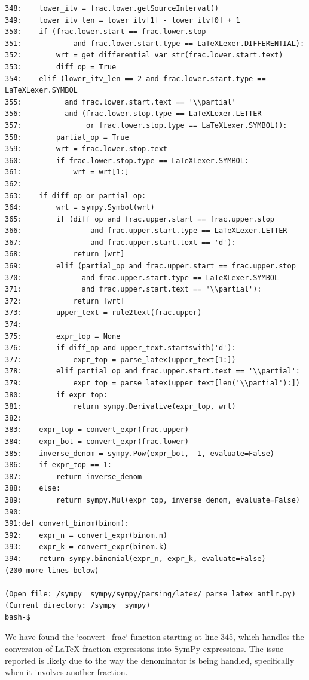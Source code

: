 {\begin{observationbox}
\begin{Verbatim}[breaklines=true, breakanywhere=true]
348:    lower_itv = frac.lower.getSourceInterval()
349:    lower_itv_len = lower_itv[1] - lower_itv[0] + 1
350:    if (frac.lower.start == frac.lower.stop
351:            and frac.lower.start.type == LaTeXLexer.DIFFERENTIAL):
352:        wrt = get_differential_var_str(frac.lower.start.text)
353:        diff_op = True
354:    elif (lower_itv_len == 2 and frac.lower.start.type == LaTeXLexer.SYMBOL
355:          and frac.lower.start.text == '\\partial'
356:          and (frac.lower.stop.type == LaTeXLexer.LETTER
357:               or frac.lower.stop.type == LaTeXLexer.SYMBOL)):
358:        partial_op = True
359:        wrt = frac.lower.stop.text
360:        if frac.lower.stop.type == LaTeXLexer.SYMBOL:
361:            wrt = wrt[1:]
362:
363:    if diff_op or partial_op:
364:        wrt = sympy.Symbol(wrt)
365:        if (diff_op and frac.upper.start == frac.upper.stop
366:                and frac.upper.start.type == LaTeXLexer.LETTER
367:                and frac.upper.start.text == 'd'):
368:            return [wrt]
369:        elif (partial_op and frac.upper.start == frac.upper.stop
370:              and frac.upper.start.type == LaTeXLexer.SYMBOL
371:              and frac.upper.start.text == '\\partial'):
372:            return [wrt]
373:        upper_text = rule2text(frac.upper)
374:
375:        expr_top = None
376:        if diff_op and upper_text.startswith('d'):
377:            expr_top = parse_latex(upper_text[1:])
378:        elif partial_op and frac.upper.start.text == '\\partial':
379:            expr_top = parse_latex(upper_text[len('\\partial'):])
380:        if expr_top:
381:            return sympy.Derivative(expr_top, wrt)
382:
383:    expr_top = convert_expr(frac.upper)
384:    expr_bot = convert_expr(frac.lower)
385:    inverse_denom = sympy.Pow(expr_bot, -1, evaluate=False)
386:    if expr_top == 1:
387:        return inverse_denom
388:    else:
389:        return sympy.Mul(expr_top, inverse_denom, evaluate=False)
390:
391:def convert_binom(binom):
392:    expr_n = convert_expr(binom.n)
393:    expr_k = convert_expr(binom.k)
394:    return sympy.binomial(expr_n, expr_k, evaluate=False)
(200 more lines below)

(Open file: /sympy__sympy/sympy/parsing/latex/_parse_latex_antlr.py)
(Current directory: /sympy__sympy)
bash-$
\end{Verbatim}
\end{observationbox}
\begin{agentbox}
We have found the `convert\_frac` function starting at line 345, which handles the conversion of LaTeX fraction expressions into SymPy expressions. The issue reported is likely due to the way the denominator is being handled, specifically when it involves another fraction.




\end{agentbox}}
